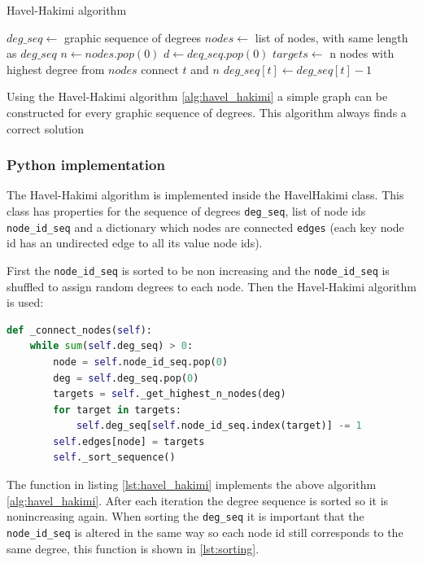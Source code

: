 \begin{algorithm}
\caption{Havel-Hakimi algorithm}
\label{alg:havel_hakimi}
\begin{algorithmic}
\State $deg\_seq \gets $ graphic sequence of degrees
\State $nodes \gets $ list of nodes, with same length as $deg\_seq$
    \State $n \gets nodes.pop(0)$
    \State $d \gets deq\_seq.pop(0)$
    \State $targets \gets $ n nodes with highest degree from $nodes$
        \State connect $t$ and $n$
        \State $deg\_seq[t] \gets deg\_seq[t] - 1$
    \EndFor
\EndWhile
\end{algorithmic}
\end{algorithm}

Using the Havel-Hakimi algorithm \ref{alg:havel_hakimi} a simple graph can be constructed for every graphic sequence of degrees. This algorithm always finds a correct solution %

\subsubsection{Python implementation}
The Havel-Hakimi algorithm is implemented inside the HavelHakimi class. This class has properties for the sequence of degrees \texttt{deg\_seq}, list of node ids \texttt{node\_id\_seq} and a dictionary which nodes are connected \texttt{edges} (each key node id has an undirected edge to all its value node ids).

First the \texttt{node\_id\_seq} is sorted to be non increasing and the \texttt{node\_id\_seq} is shuffled to assign random degrees to each node. Then the Havel-Hakimi algorithm is used:

\begin{lstlisting}[language=python, caption={Havel Hakimi Algorithm in Python}, label={lst:havel_hakimi}]
def _connect_nodes(self):
    while sum(self.deg_seq) > 0:
        node = self.node_id_seq.pop(0)
        deg = self.deg_seq.pop(0)
        targets = self._get_highest_n_nodes(deg)
        for target in targets:
            self.deg_seq[self.node_id_seq.index(target)] -= 1
        self.edges[node] = targets
        self._sort_sequence()
\end{lstlisting}

The function in listing \ref{lst:havel_hakimi} implements the above algorithm \ref{alg:havel_hakimi}. After each iteration the degree sequence is sorted so it is nonincreasing again. When sorting the \texttt{deg\_seq} it is important that the \texttt{node\_id\_seq} is altered in the same way so each node id still corresponds to the same degree, this function is shown in \ref{lst:sorting}.

